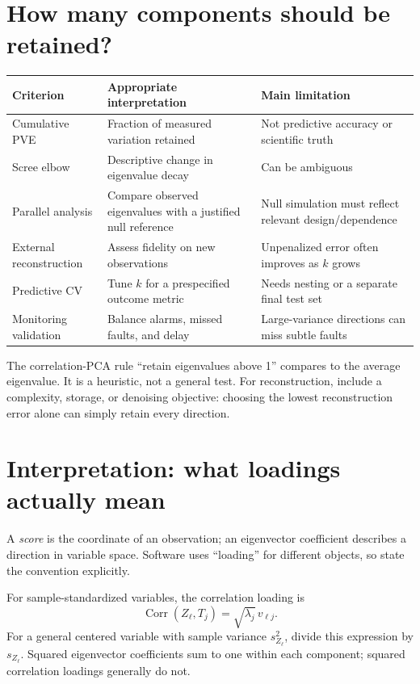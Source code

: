 \documentclass[11pt]{article}
\begin{document}
\section{How many components should be retained?}
\begin{center}\begin{tabular}{p{.23\linewidth}p{.36\linewidth}p{.32\linewidth}}\toprule
Criterion & Appropriate interpretation & Main limitation\\\midrule
Cumulative PVE & Fraction of measured variation retained & Not predictive accuracy or scientific truth\\
Scree elbow & Descriptive change in eigenvalue decay & Can be ambiguous\\
Parallel analysis & Compare observed eigenvalues with a justified null reference & Null simulation must reflect relevant design/dependence\\
External reconstruction & Assess fidelity on new observations & Unpenalized error often improves as $k$ grows\\
Predictive CV & Tune $k$ for a prespecified outcome metric & Needs nesting or a separate final test set\\
Monitoring validation & Balance alarms, missed faults, and delay & Large-variance directions can miss subtle faults\\\bottomrule
\end{tabular}\end{center}
The correlation-PCA rule ``retain eigenvalues above 1'' compares to the average eigenvalue. It is a heuristic, not a general test. For reconstruction, include a complexity, storage, or denoising objective: choosing the lowest reconstruction error alone can simply retain every direction.

\section{Interpretation: what loadings actually mean}
A \emph{score} is the coordinate of an observation; an eigenvector coefficient describes a direction in variable space. Software uses ``loading'' for different objects, so state the convention explicitly.

For sample-standardized variables, the correlation loading is
\[
\operatorname{Corr}(Z_\ell,T_j)=\sqrt{\lambda_j}\,v_{\ell j}.
\]
For a general centered variable with sample variance $s_{Z_\ell}^2$, divide this expression by $s_{Z_\ell}$. Squared eigenvector coefficients sum to one within each component; squared correlation loadings generally do not.
\end{document}
